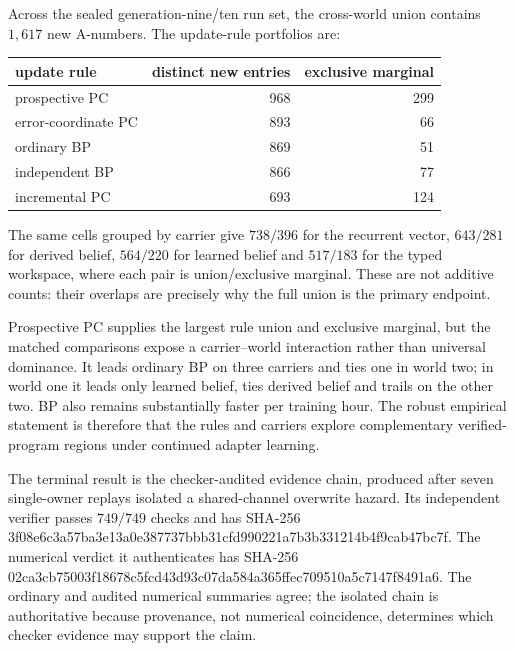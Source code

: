 \documentclass[11pt]{article}
\begin{document}
Across the sealed generation-nine/ten run set, the cross-world union contains $1{,}617$
new A-numbers. The update-rule portfolios are:

\begin{center}
\begin{tabular}{lrr}
\toprule
update rule & distinct new entries & exclusive marginal \\
\midrule
prospective PC & 968 & 299 \\
error-coordinate PC & 893 & 66 \\
ordinary BP & 869 & 51 \\
independent BP & 866 & 77 \\
incremental PC & 693 & 124 \\
\bottomrule
\end{tabular}
\end{center}

The same cells grouped by carrier give $738/396$ for the recurrent vector,
$643/281$ for derived belief, $564/220$ for learned belief and $517/183$ for the typed
workspace, where each pair is union/exclusive marginal. These are not additive counts:
their overlaps are precisely why the full union is the primary endpoint.

Prospective PC supplies the largest rule union and exclusive marginal, but the matched
comparisons expose a carrier--world interaction rather than universal dominance. It
leads ordinary BP on three carriers and ties one in world two; in world one it leads
only learned belief, ties derived belief and trails on the other two. BP also remains
substantially faster per training hour. The robust empirical statement is therefore
that the rules and carriers explore complementary verified-program regions under
continued adapter learning.

The terminal result is the checker-audited evidence chain, produced after seven
single-owner replays isolated a shared-channel overwrite hazard. Its independent
verifier passes $749/749$ checks and has SHA-256
{\scriptsize\ttfamily
3f08e6c3a57ba3e13a0e387737bbb31cfd990221a7b3b331214b4f9cab47bc7f}.
The numerical verdict it authenticates has SHA-256
{\scriptsize\ttfamily
02ca3cb75003f18678c5fcd43d93c07da584a365ffec709510a5c7147f8491a6}.
The ordinary and audited numerical summaries agree; the isolated chain is authoritative
because provenance, not numerical coincidence, determines which checker evidence may
support the claim.
\end{document}
